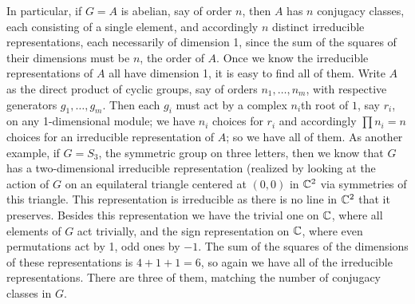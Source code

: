 \documentclass[10pt]{article}
\begin{document}
In particular, if $G=A$ is abelian, say of order $n$, then $A$ has $n$
conjugacy classes, each consisting of a single element, and accordingly
$n$ distinct irreducible representations, each necessarily of dimension
1, since the sum of the squares of their dimensions must be $n$, the
order of $A$. Once we know the irreducible representations of $A$ all
have dimension 1, it is easy to find all of them. Write $A$ as the
direct product of cyclic groups, say of orders $n_1,\ldots,n_m$, with
respective generators $g_1,\ldots,g_m$. Then each $g_i$ must act by a
complex $n_i$th root of $1$, say $r_i$, on any 1-dimensional module; we
have $n_i$ choices for $r_i$ and accordingly $\prod n_i = n$ choices for
an irreducible representation of $A$; so we have all of them. As another
example, if $G=S_3$, the symmetric group on three letters, then we know
that $G$ has a two-dimensional irreducible representation (realized by
looking at the action of $G$ on an equilateral triangle centered at
$(0,0)$ in $\Bbb C^2$ via symmetries of this triangle. This
representation is irreducible as there is no line in $\Bbb C^2$ that it
preserves. Besides this representation we have the trivial one on $\Bbb
C$, where all elements of $G$ act trivially, and the sign representation
on $\Bbb C$, where even permutations act by 1, odd ones by $-1$. The sum
of the squares of the dimensions of these representations is $4+1+1= 6$,
so again we have all of the irreducible representations. There are three
of them, matching the number of conjugacy classes in $G$.
\end{document}
